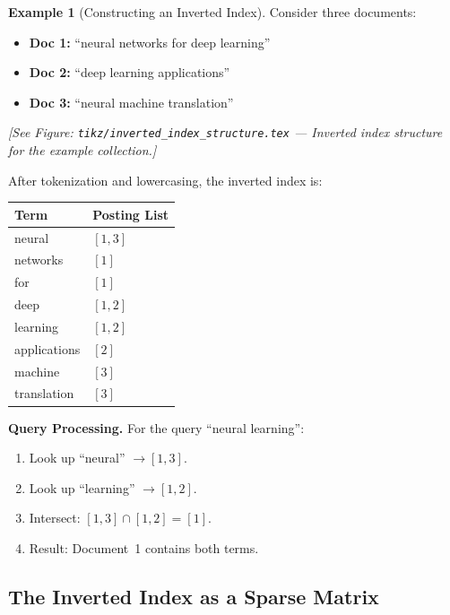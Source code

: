 \documentclass[aspectratio=169]{beamer} \usetheme{TUDelft} %
\theoremstyle{definition}
\newtheorem{example}{Example}[section]
\theoremstyle{plain}
\begin{document}
\begin{example}[Constructing an Inverted Index]
\label{ex:inverted-index}
Consider three documents:
\begin{itemize}
    \item \textbf{Doc 1:} ``neural networks for deep learning''
    \item \textbf{Doc 2:} ``deep learning applications''
    \item \textbf{Doc 3:} ``neural machine translation''
\end{itemize}

\begin{center}
\textit{[See Figure: \texttt{tikz/inverted\_index\_structure.tex} --- Inverted index structure for the example collection.]}
\end{center}

After tokenization and lowercasing, the inverted index is:

\begin{center}
\begin{tabular}{ll}
\toprule
\textbf{Term} & \textbf{Posting List} \\
\midrule
neural & $[1, 3]$ \\
networks & $[1]$ \\
for & $[1]$ \\
deep & $[1, 2]$ \\
learning & $[1, 2]$ \\
applications & $[2]$ \\
machine & $[3]$ \\
translation & $[3]$ \\
\bottomrule
\end{tabular}
\end{center}

\textbf{Query Processing.} For the query ``neural learning'':
\begin{enumerate}
    \item Look up ``neural'' $\to [1, 3]$.
    \item Look up ``learning'' $\to [1, 2]$.
    \item Intersect: $[1, 3] \cap [1, 2] = [1]$.
    \item Result: Document~1 contains both terms.
\end{enumerate}
\end{example}

\subsection{The Inverted Index as a Sparse Matrix}
\end{document}
